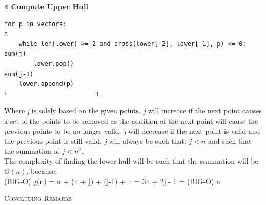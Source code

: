 \documentclass[pdftex,12pt,a4paper]{article}
\newcommand{\nspace}{\\[0.25cm]}
\begin{document}
{\bf \large 4 Compute Upper Hull}
\begin{verbatim}
for p in vectors:                                                     n
    while len(lower) >= 2 and cross(lower[-2], lower[-1], p) <= 0:    sum(j)
        lower.pop()                                                   sum(j-1)
    lower.append(p)                                                   n                        1
\end{verbatim}

Where \emph{j} is solely based on the given points. \emph{j} will increase if the next point causes a set of the points to be removed as the addition of the next point will cause the previous points to be no longer valid. \emph{j} will decrease if the next point is valid and the previous point is still valid. \emph{j} will always be such that: $j < n$ and such that the summation of $j < n^2$.\nspace

The complexity of finding the lower hull will be such that the summation will be $O(n)$, because:\nspace
(BIG-O) g(n) = n + (n + j) + (j-1) + n
             = 3n + 2j - 1
             = (BIG-O) n

\textsc{\Large Concluding Remarks} \hfill \nspace








\end{document}
